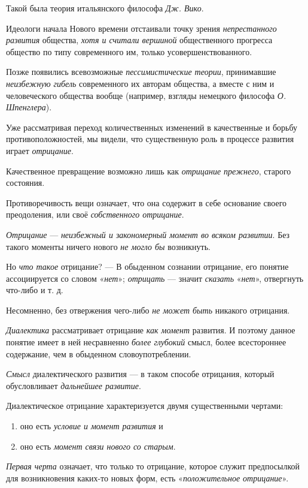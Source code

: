 \documentclass[a4paper,14pt,russian]{extreport}
\begin{document}
Такой была теория итальянского философа \emph{Дж. Вико}.

Идеологи начала Нового времени отстаивали точку зрения \emph{непрестанного развития} общества, \emph{хотя и считали вершиной} общественного прогресса общество по типу современного им, только усовершенствованного.

Позже появились всевозможные \emph{пессимистические теории}, принимавшие \emph{неизбежную гибель} современного их авторам общества, а вместе с ним и человеческого общества вообще (например, взгляды немецкого философа \emph{О. Шпенглера}).

Уже рассматривая переход количественных изменений в качественные и борьбу противоположностей, мы видели, что существенную роль в процессе развития играет \emph{отрицание}.

Качественное превращение возможно лишь как \emph{отрицание прежнего}, старого состояния.

Противоречивость вещи означает, что она содержит в себе основание своего преодоления, или своё \emph{собственного отрицание}.

\emph{Отрицание} --- \emph{неизбежный и закономерный момент во всяком развитии}. Без такого моменты ничего нового \emph{не могло бы} возникнуть.

Но \emph{что такое} отрицание? --- В обыденном сознании отрицание, его понятие ассоциируется со словом «\emph{нет}»; \emph{отрицать} --- значит \emph{сказать} «\emph{нет}», отвергнуть что-либо и т. д.

Несомненно, без отвержения чего-либо \emph{не может быть} никакого отрицания.

\emph{Диалектика} рассматривает отрицание \emph{как момент} развития. И поэтому данное понятие имеет в ней несравненно \emph{более глубокий} смысл, более всестороннее содержание, чем в обыденном словоупотреблении.

\emph{Смысл} диалектического развития --- в таком способе отрицания, который обусловливает \emph{дальнейшее развитие}.

Диалектическое отрицание характеризуется двумя существенными чертами:

\begin{enumerate}
\item оно есть \emph{условие и момент развития} и
\item оно есть \emph{момент связи нового со старым}.
\end{enumerate}

\emph{Первая черта} означает, что только то отрицание, которое служит предпосылкой для возникновения каких-то новых форм, есть «\emph{положительное отрицание}».
\end{document}
